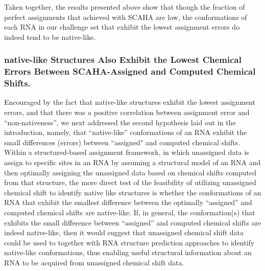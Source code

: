 \documentclass[journal=jcisd8,manuscript=article,layout=onecolumn]{achemso}
\begin{document}
Taken together, the results presented above show that though the fraction of perfect assignments that achieved with SCAHA are low, the conformations of each RNA in our challenge set that exhibit the lowest assignment errors do indeed tend to be native-like.

\subsubsection{native-like Structures Also Exhibit the Lowest Chemical Errors Between SCAHA-Assigned and Computed Chemical Shifts.} Encouraged by the fact that native-like structures exhibit the lowest assignment errors, and that there was a positive correlation between assignment error and ``non-nativeness'', we next addressed the second hypothesis laid out in the introduction, namely, that “native-like” conformations of an RNA exhibit the small differences (errors) between ``assigned" and computed chemical shifts. Within a structured-based assignment framework, in which unassigned data is assign to specific sites in an RNA by assuming a structural model of an RNA and then optimally assigning the unassigned data based on chemical shifts computed from that structure, the more direct test of the feasibility of utilizing unassigned chemical shift to identify native like structures is whether the conformations of an RNA that exhibit the smallest difference between the optimally ``assigned'' and computed chemical shifts are native-like. If, in general, the conformation(s) that exhibits the small difference between ``assigned'' and computed chemical shifts are indeed native-like, then it would suggest that unassigned chemical shift data could be used to together with RNA structure prediction approaches to identify native-like conformations, thus enabling useful structural information about an RNA to be acquired from unassigned chemical shift data.
\end{document}
